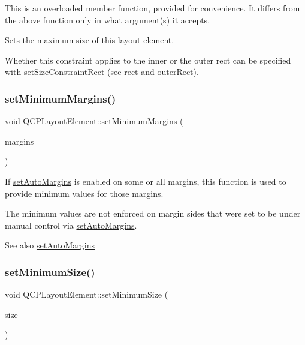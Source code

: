 This is an overloaded member function, provided for convenience. It differs from the above function only in what argument(s) it accepts.

Sets the maximum size of this layout element.

Whether this constraint applies to the inner or the outer rect can be specified with \mbox{\hyperlink{class_q_c_p_layout_element_a361666cdcc6fbfd37344cc44be746b0f}{set\+Size\+Constraint\+Rect}} (see \mbox{\hyperlink{class_q_c_p_layout_element_a208effccfe2cca4a0eaf9393e60f2dd4}{rect}} and \mbox{\hyperlink{class_q_c_p_layout_element_a2a32a12a6161c9dffbadeb9cc585510c}{outer\+Rect}}). \mbox{\label{class_q_c_p_layout_element_a0a8a17abc16b7923159fcc7608f94673}} 
\subsubsection{\texorpdfstring{setMinimumMargins()}{setMinimumMargins()}}
{\footnotesize\ttfamily void Q\+C\+P\+Layout\+Element\+::set\+Minimum\+Margins (\begin{DoxyParamCaption}\item[{const Q\+Margins \&}]{margins }\end{DoxyParamCaption})}

If \mbox{\hyperlink{class_q_c_p_layout_element_accfda49994e3e6d51ed14504abf9d27d}{set\+Auto\+Margins}} is enabled on some or all margins, this function is used to provide minimum values for those margins.

The minimum values are not enforced on margin sides that were set to be under manual control via \mbox{\hyperlink{class_q_c_p_layout_element_accfda49994e3e6d51ed14504abf9d27d}{set\+Auto\+Margins}}.

\begin{DoxySeeAlso}{See also}
\mbox{\hyperlink{class_q_c_p_layout_element_accfda49994e3e6d51ed14504abf9d27d}{set\+Auto\+Margins}} 
\end{DoxySeeAlso}
\mbox{\label{class_q_c_p_layout_element_a5dd29a3c8bc88440c97c06b67be7886b}} 
\subsubsection{\texorpdfstring{setMinimumSize()}{setMinimumSize()}\hspace{0.1cm}{\footnotesize\ttfamily [1/2]}}
{\footnotesize\ttfamily void Q\+C\+P\+Layout\+Element\+::set\+Minimum\+Size (\begin{DoxyParamCaption}\item[{const Q\+Size \&}]{size }\end{DoxyParamCaption})}

